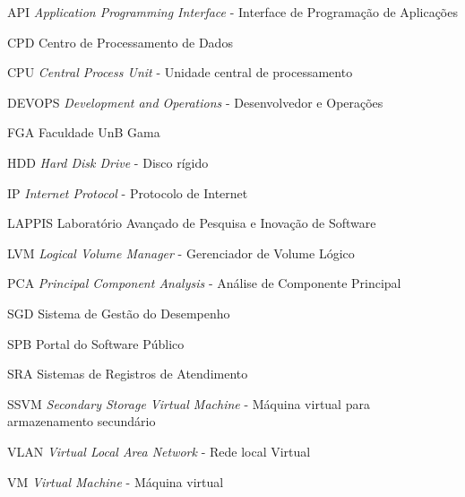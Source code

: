 \begin{siglas}
  
  \item [API] \textit{Application Programming Interface} - Interface de Programação de Aplicações 
  \item [CPD] Centro de Processamento de Dados
  \item [CPU] \textit{Central Process Unit} - Unidade central de processamento
  \item[DEVOPS] \textit{Development and Operations} - Desenvolvedor e Operações
  \item[FGA] Faculdade UnB Gama
  \item[HDD] \textit{Hard Disk Drive} - Disco rígido
  \item[IP] \textit{Internet Protocol} - Protocolo de Internet
  \item[LAPPIS] Laboratório Avançado de Pesquisa e Inovação de Software
  \item[LVM] \textit{Logical Volume Manager} - Gerenciador de Volume Lógico
  \item [PCA] \textit{Principal Component Analysis} - Análise de Componente Principal
  \item[SGD] Sistema de Gestão do Desempenho
  \item[SPB] Portal do Software Público
  \item[SRA] Sistemas de Registros de Atendimento
  \item [SSVM] \textit{Secondary Storage Virtual Machine} - Máquina virtual para armazenamento secundário  
  \item[VLAN] \textit{Virtual Local Area Network} - Rede local Virtual
  \item[VM] \textit{Virtual Machine} - Máquina virtual

  
  
 
 
  
\end{siglas}
